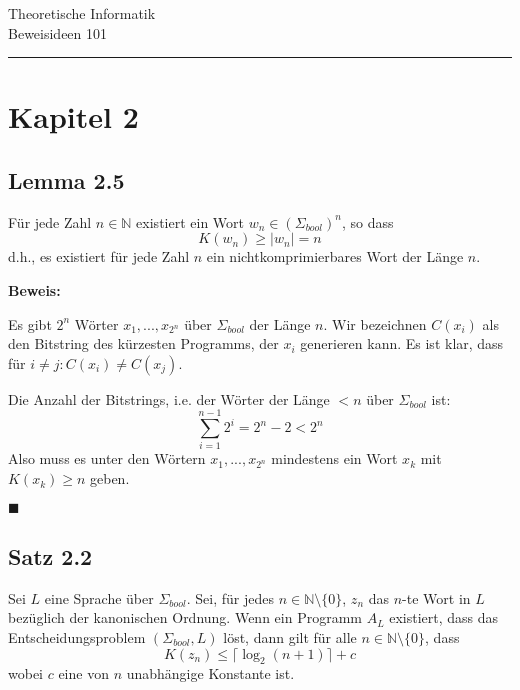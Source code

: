 \documentclass[a4paper, 11pt]{article}
\def\N{\mathbb{N}}
\begin{document}
    \begin{center}
        \LARGE {Theoretische Informatik \\ Beweisideen 101}
        \vspace{15pt}
        \hrule
    \end{center}
   
    \vspace{5pt}
    \section*{Kapitel 2}
    \subsection*{Lemma 2.5}
    Für jede Zahl $n \in \N$ existiert ein Wort $w_n \in  (\Sigma_{bool})^n$, so dass $$K(w_n) \geq |w_n| = n$$
    d.h., es existiert für jede Zahl $n$ ein nichtkomprimierbares Wort der Länge $n$.

    \textbf{Beweis: }
    
    Es gibt $2^n$ Wörter $x_1, ..., x_{2^n}$ über $\Sigma_{bool}$ der Länge $n$. Wir bezeichnen $C(x_i)$ als den Bitstring des kürzesten Programms, der $x_i$ generieren kann. Es ist klar, dass für $i \neq j: C(x_i) \neq C(x_j)$.
    
    Die Anzahl der Bitstrings, i.e. der Wörter der Länge $< n$ über $\Sigma_{bool}$ ist:
    $$\sum_{i = 1}^{n-1} 2^i = 2^n - 2 < 2^n$$
    Also muss es unter den Wörtern $x_1, ...,x_{2^n}$ mindestens ein Wort $x_k$ mit $K(x_k) \geq n$ geben.
    
    \hspace*{0pt}\hfill$\blacksquare$

    \subsection*{Satz 2.2}
    Sei $L$ eine Sprache über $\Sigma_{bool}$. Sei, für jedes $n \in \N \setminus \{0\}$, $z_n$ das $n$-te Wort in $L$ bezüglich der kanonischen Ordnung. Wenn ein Programm $A_L$ existiert, dass das Entscheidungsproblem $(\Sigma_{bool}, L)$ löst, dann gilt für alle $n \in \N \setminus \{0\}$, dass 
    $$K(z_n) \leq \lceil \log_2(n+1)\rceil + c$$
    wobei $c$ eine von $n$ unabhängige Konstante ist.
\end{document}
